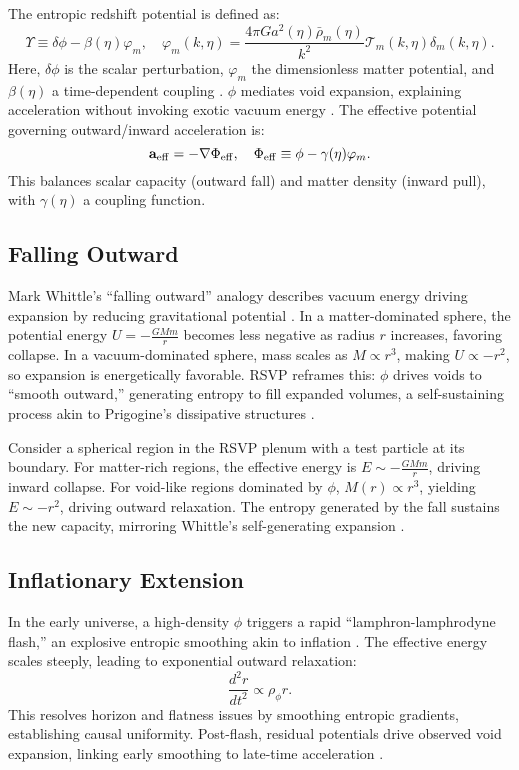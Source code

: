 \documentclass{article}
\begin{document}
The entropic redshift potential is defined as:
\[
\Upsilon \equiv \delta\phi - \beta(\eta)\varphi_m, \quad \varphi_m(k,\eta) = \frac{4\pi G a^2(\eta) \bar{\rho}_m(\eta)}{k^2} \mathcal{T}_m(k,\eta) \delta_m(k,\eta).
\]
Here, \(\delta\phi\) is the scalar perturbation, \(\varphi_m\) the dimensionless matter potential, and \(\beta(\eta)\) a time-dependent coupling \citep{dodelson2003}. \(\phi\) mediates void expansion, explaining acceleration without invoking exotic vacuum energy \citep{einstein1917, desitter1917, peebles2003}. The effective potential governing outward/inward acceleration is:
\[
\mathbf{a}_{\rm eff} = -\nabla \Phi_{\rm eff}, \quad \Phi_{\rm eff} \equiv \phi - \gamma(\eta) \varphi_m.
\]
This balances scalar capacity (outward fall) and matter density (inward pull), with \(\gamma(\eta)\) a coupling function.

\subsection{Falling Outward}
Mark Whittle's ``falling outward'' analogy describes vacuum energy driving expansion by reducing gravitational potential \citep{whittle2015, whittle2006}. In a matter-dominated sphere, the potential energy \(U = -\frac{G M m}{r}\) becomes less negative as radius \(r\) increases, favoring collapse. In a vacuum-dominated sphere, mass scales as \(M \propto r^3\), making \(U \propto -r^2\), so expansion is energetically favorable. RSVP reframes this: \(\phi\) drives voids to ``smooth outward,'' generating entropy to fill expanded volumes, a self-sustaining process akin to Prigogine's dissipative structures \citep{prigogine1984, whittle2015}.

Consider a spherical region in the RSVP plenum with a test particle at its boundary. For matter-rich regions, the effective energy is \(E \sim -\frac{G M m}{r}\), driving inward collapse. For void-like regions dominated by \(\phi\), \(M(r) \propto r^3\), yielding \(E \sim -r^2\), driving outward relaxation. The entropy generated by the fall sustains the new capacity, mirroring Whittle's self-generating expansion \citep{whittle2015}.

\subsection{Inflationary Extension}
In the early universe, a high-density \(\phi\) triggers a rapid ``lamphron-lamphrodyne flash,'' an explosive entropic smoothing akin to inflation \citep{whittle2015}. The effective energy scales steeply, leading to exponential outward relaxation:
\[
\frac{d^2 r}{dt^2} \propto \rho_\phi r.
\]
This resolves horizon and flatness issues by smoothing entropic gradients, establishing causal uniformity. Post-flash, residual potentials drive observed void expansion, linking early smoothing to late-time acceleration \citep{desitter1917}.
\end{document}
